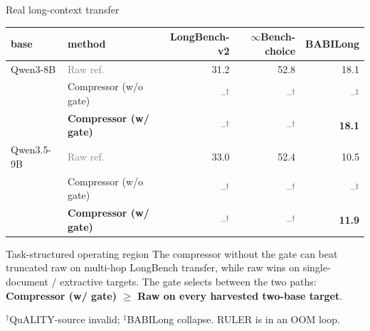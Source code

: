\begin{frame}{Real long-context transfer}
  \centering\scriptsize
  \begin{tabular}{llrrr}
  \toprule
  base & method & LongBench-v2 & $\infty$Bench-choice & BABILong \\
  \midrule
  Qwen3-8B & \textcolor{gray}{Raw ref.} & 31.2 & 52.8 & 18.1 \\
            & Compressor (w/o gate) & --$^\dagger$ & --$^\dagger$ & --$^\ddagger$ \\
            & \textbf{Compressor (w/ gate)} & --$^\dagger$ & --$^\dagger$ & \textbf{18.1} \\
  Qwen3.5-9B & \textcolor{gray}{Raw ref.} & 33.0 & 52.4 & 10.5 \\
              & Compressor (w/o gate) & --$^\dagger$ & --$^\dagger$ & --$^\ddagger$ \\
              & \textbf{Compressor (w/ gate)} & --$^\dagger$ & --$^\dagger$ & \textbf{11.9} \\
  \bottomrule
  \end{tabular}
  \vspace{0.45em}
  \begin{block}{Task-structured operating region}
    \footnotesize The compressor without the gate can beat truncated raw on multi-hop LongBench transfer, while raw wins on
    single-document / extractive targets. The gate selects between the two paths:
    \textbf{Compressor (w/ gate) $\ge$ Raw on every harvested two-base target}.
  \end{block}
  \footnotesize $^\dagger$QuALITY-source invalid; $^\ddagger$BABILong collapse. RULER is in an OOM loop.
\end{frame}

